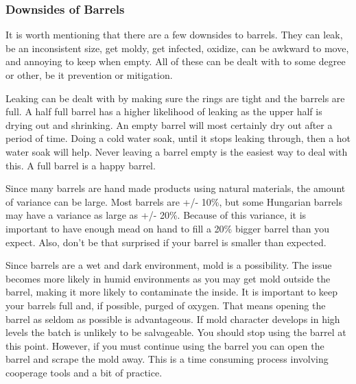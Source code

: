   \subsubsection{Downsides of Barrels}
   It is worth mentioning that there are a few downsides to barrels. They can leak, be an inconsistent size,
   get moldy, get infected, oxidize, can be awkward to move, and annoying to keep when empty.
   All of these can be dealt with to some degree or other, be it prevention or mitigation.

   Leaking can be dealt with by making sure the rings are tight and the barrels are full. A half full barrel has
   a higher likelihood of leaking as the upper half is drying out and shrinking. An empty barrel will most
   certainly dry out after a period of time. Doing a cold water soak, until it stops leaking through, then 
   a hot water soak will help. Never leaving a barrel empty is the easiest way to deal with this. A full
   barrel is a happy barrel.

   Since many barrels are hand made products using natural materials, the amount of variance can be large.
   Most barrels are +/- 10\%, but some Hungarian barrels may have a variance as large as +/- 20\%.
   Because of this variance, it is important to have enough mead on hand to fill a 20\% bigger barrel than you expect.
   Also, don't be that surprised if your barrel is smaller than expected.

   Since barrels are a wet and dark environment, mold is a possibility. The issue becomes more likely in humid
   environments as you may get mold outside the barrel, making it more likely to contaminate the inside.
   It is important to keep your barrels full and, if possible, purged of oxygen.
   That means opening the barrel as seldom as possible is advantageous.
   If mold character develops in high levels the batch is unlikely to be salvageable. You should stop using the barrel
   at this point. However, if you must continue using the barrel you can open the barrel and scrape the mold away.
   This is a time consuming process involving cooperage tools and a bit of practice.

